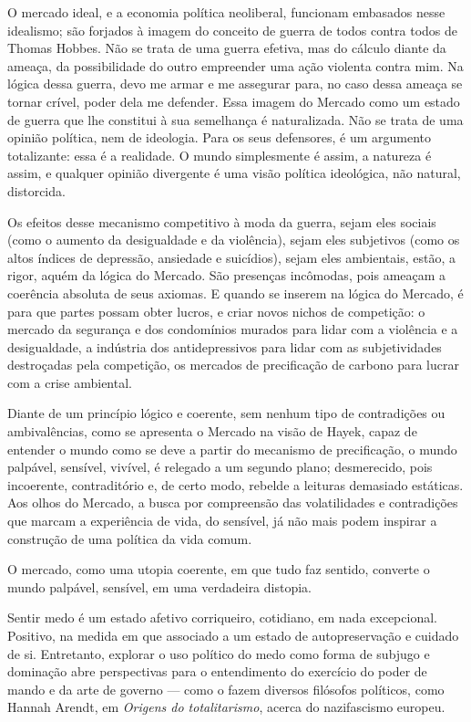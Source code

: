 O mercado ideal, e a economia política neoliberal, funcionam embasados
nesse idealismo; são forjados à imagem do conceito de guerra de todos
contra todos de Thomas Hobbes. Não se trata de uma guerra efetiva, mas
do cálculo diante da ameaça, da possibilidade do outro empreender uma
ação violenta contra mim. Na lógica dessa guerra, devo me armar e me
assegurar para, no caso dessa ameaça se tornar crível, poder dela me
defender. Essa imagem do Mercado como um estado de guerra que lhe
constitui à sua semelhança é naturalizada. Não se trata de uma opinião
política, nem de ideologia. Para os seus defensores, é um argumento
totalizante: essa é a realidade. O mundo simplesmente é assim, a
natureza é assim, e qualquer opinião divergente é uma visão política
ideológica, não natural, distorcida.

Os efeitos desse mecanismo competitivo à moda da guerra, sejam eles
sociais (como o aumento da desigualdade e da violência), sejam eles
subjetivos (como os altos índices de depressão, ansiedade e suicídios),
sejam eles ambientais, estão, a rigor, aquém da lógica do Mercado. São
presenças incômodas, pois ameaçam a coerência absoluta de seus axiomas.
E quando se inserem na lógica do Mercado, é para que partes possam obter
lucros, e criar novos nichos de competição: o mercado da segurança e dos
condomínios murados para lidar com a violência e a desigualdade, a
indústria dos antidepressivos para lidar com as subjetividades
destroçadas pela competição, os mercados de precificação de carbono para
lucrar com a crise ambiental.

Diante de um princípio lógico e coerente, sem nenhum tipo de
contradições ou ambivalências, como se apresenta o Mercado na visão de
Hayek, capaz de entender o mundo como se deve a partir do mecanismo de
precificação, o mundo palpável, sensível, vivível, é relegado a um
segundo plano; desmerecido, pois incoerente, contraditório e, de certo
modo, rebelde a leituras demasiado estáticas. Aos olhos do Mercado, a
busca por compreensão das volatilidades e contradições que marcam a
experiência de vida, do sensível, já não mais podem inspirar a
construção de uma política da vida comum.

O mercado, como uma utopia coerente, em que tudo faz sentido, converte o
mundo palpável, sensível, em uma verdadeira distopia.

\asterisc

Sentir medo é um estado afetivo corriqueiro, cotidiano, em nada
excepcional. Positivo, na medida em que associado a um estado de
autopreservação e cuidado de si. Entretanto, explorar o uso político do
medo como forma de subjugo e dominação abre perspectivas para o
entendimento do exercício do poder de mando e da arte de governo --- como o
fazem diversos filósofos políticos, como Hannah Arendt, em
\emph{Origens do totalitarismo}, acerca do nazifascismo europeu.

